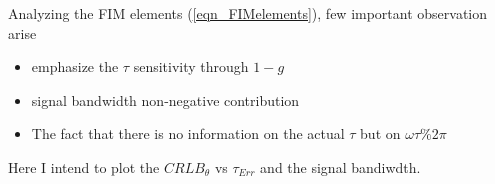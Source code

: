 \else
\fi
Analyzing the FIM elements (\ref{eqn_FIMelements}), few important observation arise
\begin{itemize}
    \item emphasize the $\tau$ sensitivity through $1-g$ 
    \item signal bandwidth non-negative contribution
    \item The fact that there is no information on the actual $\tau$ but on $\omega\tau \% 2\pi$
\end{itemize}
Here I intend to plot the $CRLB_{\theta}$ vs $\tau_{Err}$ and the signal bandiwdth.
